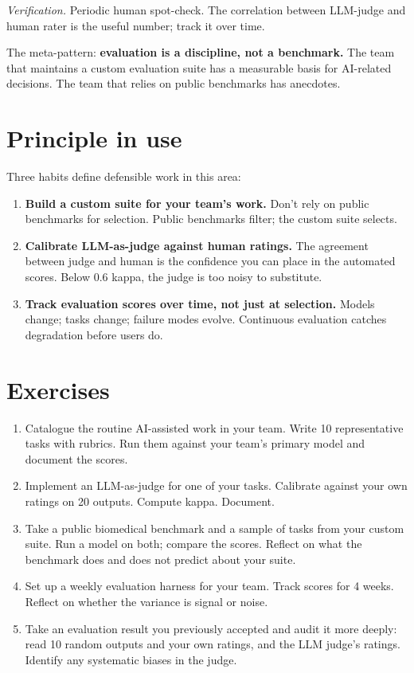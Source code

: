 \documentclass[
  letterpaper,
  11pt]{scrbook}
\begin{document}
\emph{Verification.} Periodic human spot-check. The correlation between
LLM-judge and human rater is the useful number; track it over time.

The meta-pattern: \textbf{evaluation is a discipline, not a benchmark.}
The team that maintains a custom evaluation suite has a measurable basis
for AI-related decisions. The team that relies on public benchmarks has
anecdotes.

\section{Principle in use}\label{principle-in-use-9}

Three habits define defensible work in this area:

\begin{enumerate}
\def\labelenumi{\arabic{enumi}.}
\item
  \textbf{Build a custom suite for your team's work.} Don't rely on
  public benchmarks for selection. Public benchmarks filter; the custom
  suite selects.
\item
  \textbf{Calibrate LLM-as-judge against human ratings.} The agreement
  between judge and human is the confidence you can place in the
  automated scores. Below 0.6 kappa, the judge is too noisy to
  substitute.
\item
  \textbf{Track evaluation scores over time, not just at selection.}
  Models change; tasks change; failure modes evolve. Continuous
  evaluation catches degradation before users do.
\end{enumerate}

\section{Exercises}\label{exercises-9}

\begin{enumerate}
\def\labelenumi{\arabic{enumi}.}
\item
  Catalogue the routine AI-assisted work in your team. Write 10
  representative tasks with rubrics. Run them against your team's
  primary model and document the scores.
\item
  Implement an LLM-as-judge for one of your tasks. Calibrate against
  your own ratings on 20 outputs. Compute kappa. Document.
\item
  Take a public biomedical benchmark and a sample of tasks from your
  custom suite. Run a model on both; compare the scores. Reflect on what
  the benchmark does and does not predict about your suite.
\item
  Set up a weekly evaluation harness for your team. Track scores for 4
  weeks. Reflect on whether the variance is signal or noise.
\item
  Take an evaluation result you previously accepted and audit it more
  deeply: read 10 random outputs and your own ratings, and the LLM
  judge's ratings. Identify any systematic biases in the judge.
\end{enumerate}
\end{document}
